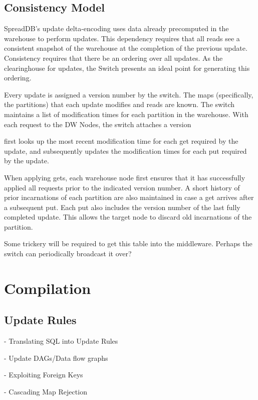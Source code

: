 \documentclass{sig-alternate}
\begin{document}
\subsection{Consistency Model}

SpreadDB's update delta-encoding uses data already precomputed in the warehouse to perform updates.  This dependency requires that all reads see a consistent snapshot of the warehouse at the completion of the previous update.  Consistency requires that there be an ordering over all updates.  As the clearinghouse for updates, the Switch presents an ideal point for generating this ordering.  

Every update is assigned a version number by the switch.  The maps (specifically, the partitions) that each update modifies and reads are known.  The switch maintains a list of modification times for each partition in the warehouse.  With each request to the DW Nodes, the switch attaches a version 

 first looks up the most recent modification time for each get required by the update, and subsequently updates the modification times for each put required by the update.  

When applying gets, each warehouse node first ensures that it has successfully applied all requests prior to the indicated version number.  A short history of prior incarnations of each partition are also maintained in case a get arrives after a subsequent put.  Each put also includes the version number of the last fully completed update.  This allows the target node to discard old incarnations of the partition.

Some trickery will be required to get this table into the middleware.  Perhaps the switch can periodically broadcast it over?

\section{Compilation}
\label{sec:compilation}

\subsection{Update Rules}
- Translating SQL into Update Rules

- Update DAGs/Data flow graphs

- Exploiting Foreign Keys

- Cascading Map Rejection
\end{document}

